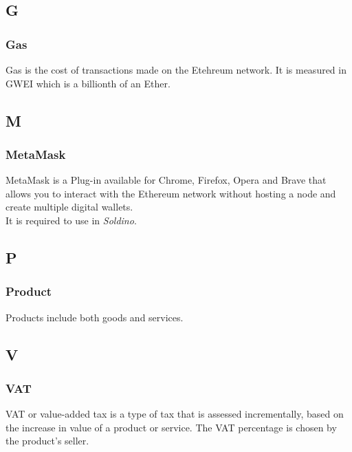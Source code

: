 	\subsection*{G}
		\subsubsection*{Gas}
		Gas is the cost of transactions made on the Etehreum network. It is 
		measured in GWEI which is a billionth of an Ether.
		
	\subsection*{M}
		\subsubsection*{MetaMask}
		MetaMask is a Plug-in available for Chrome, Firefox, Opera and Brave that 
		allows you to interact with the Ethereum network without hosting a node 
		and create multiple digital wallets\glo.
		\\It is required to use in \textit{Soldino}.
		
	\subsection*{P}
		\subsubsection*{Product}
		Products include both goods and services.
		
	\subsection*{V}
		\subsubsection*{VAT}
		VAT or value-added tax is a type of tax that is assessed incrementally, 
		based on the increase in value of a product or service. The VAT 
		percentage is chosen by the product's seller.